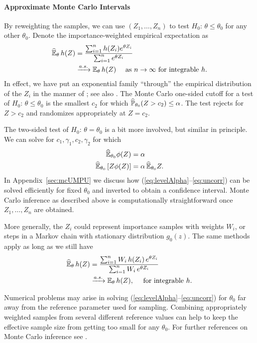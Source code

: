 \documentclass{article}
\theoremstyle{definition}
\begin{document}
\paragraph{Approximate Monte Carlo Intervals}

By reweighting the samples, we can use $(Z_1,\ldots,Z_n)$ to test $H_0:\, \theta\leq \theta_0$ for any other $\theta_0$. Denote the importance-weighted empirical expectation as
\begin{align}
  \widehat \E_\theta \,h(Z) &=
  \frac{\sum_{i=1}^n h(Z_i) e^{\theta Z_i}}
  {\sum_{i=1}^n e^{\theta Z_i}}\\
  &\toAS \E_\theta \,h(Z) \quad \text{ as $n\to\infty$ for integrable } h.
\end{align}
In effect, we have put an exponential family ``through'' the empirical distribution of the $Z_i$ in the manner of \citet{efron1996using}; see also \citet{besag2001markov}. The Monte Carlo one-sided cutoff for a test of $H_0:\, \theta\leq \theta_0$ is the smallest $c_2$ for which $\widehat \P_{\theta_0} (Z> c_2) \leq \alpha$.
The test rejects for $Z>c_2$ and randomizes appropriately at $Z=c_2$.

The two-sided test of $H_0:\,
\theta=\theta_0$ is a bit more involved, but similar in principle. We can solve for
$c_1,\gamma_1,c_2,\gamma_2$ for which
\begin{align}\label{eq:levelAlpha}
  \widehat \E_{\theta_0} \phi(Z) &= \alpha\\\label{eq:uncorr}
  \widehat \E_{\theta_0} \left[Z\phi(Z) \right]
  &= \alpha\,\widehat\E_{\theta_0} Z.
\end{align}
In Appendix~\ref{sec:mcUMPU} we discuss how
(\ref{eq:levelAlpha}--\ref{eq:uncorr}) can be solved
efficiently for fixed $\theta_0$ and inverted to obtain a confidence
interval. Monte Carlo inference as described above is computationally
straightforward once $Z_1,\ldots,Z_n$ are obtained.

More generally, the $Z_i$ could represent importance samples with weights $W_i$, or steps in a Markov chain with stationary distribution
$g_0(z)$. The same methods apply as long as we still have
\begin{align}
  \widehat \E_\theta\, h(Z) &=
  \frac{\sum_{i=1}^n W_i\, h(Z_i)\, e^{\theta Z_i}}
  {\sum_{i=1}^n W_i\, e^{\theta Z_i}}\\
  &\toAS \E_\theta\, h(Z), \quad \text{ for integrable } h.
\end{align}

Numerical problems may arise in solving (\ref{eq:levelAlpha}--\ref{eq:uncorr}) for $\theta_0$ far away from the reference parameter used for sampling. Combining appropriately weighted samples from several different reference values can help to keep the effective sample size from getting too small for any $\theta_0$. For further references on Monte Carlo inference see
\citet{jockel1986finite,forster1996monte,mehta2000efficient}.
\end{document}
